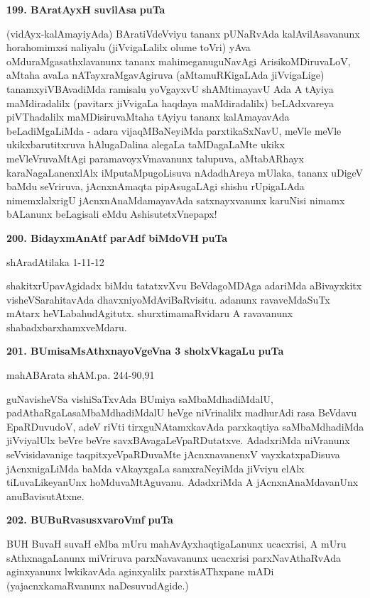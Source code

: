 \medskip
\noindent
\textbf{199. BAratAyxH suvilAsa} \hfill{\bf puTa \pageref{75}}

\smallskip
(vidAyx-kalAmayiyAda) BAratiVdeVviyu tananx pUNaRvAda kalAvilAsa\-vanunx horahomimxsi naliyalu (jiVvigaLalilx olume toVri) yAva oMdu\break raMgasathxlavanunx tananx mahimeganuguNavAgi Arisi\-koMDiruvaLoV, aMtaha avaLa nATayxraMgavAgiruva (aMtamuRKigaLAda jiVvigaLige) tanamxyiVBAva\-diMda rami\-salu yoVgayxvU shAMtimayavU Ada A tAyiya maMdiradalilx (pavitarx jiVvigaLa haqdaya maMdira\-dalilx) beLAdxvareya piVThadalilx maMDisiruvaMtaha tAyiyu tananx kalAmayavAda beLadiMga\-LiMda - adara vijaqMBaNeyiMda parxtikaSxNavU, meVle meVle ukikxbarutitxruva hAlugaDalina alegaLa taMDagaLaMte ukikx meVleVruvaMtAgi paramavoyxVmavanunx talupuva, aMtabARhayx karaNagaLanenxlAlx iMpu\-taMpu\-goLisuva nAdadhAreya mUlaka, tananx uDigeV baMdu seVriruva, jAcnxnAmaqta pipAsugaLAgi shishu rUpigaLAda nimemxlalxrigU jAcnxnAnaMdamayavAda satxnayxvanunx karuNisi nimamx bALanunx beLagisali eMdu AshisutetxVnepapx!

\medskip
\noindent
\textbf{200. BidayxmAnAtf parAdf biMdoVH} \hfill{\bf puTa \pageref{151}}

\hfill{shAradAtilaka 1-11-12}

\smallskip
shakitxrUpavAgidadx biMdu tatatxvXvu BeVdagoMDAga adariMda aBivayxkitx visheVSa\-rahitavAda dhavxniyoMdA\-viBaRvisitu. adanunx ravaveMdaSuTx mAtarx heVLabahu\-dAgitutx. shurxtimamaRvidaru A ravavanunx shabadxbarxhamx\-veMdaru.

\medskip
\noindent
\textbf{201. BUmisaMsAthxnayoVgeVna 3 sholxVkagaLu} \hfill{\bf puTa \pageref{26}}

\hfill{mahABArata shAM.pa. 244-90,91}

\smallskip
guNavisheVSa vishiSaTxvAda BUmiya saMbaMdhadiMdalU, padAthaRgaLa\break saMbaMdha\-diMdalU heVge niVrinalilx madhurAdi rasa BeVdavu EpaRDuvudoV, adeV riVti tirxguNAtamxkavAda parxkaqtiya saMbaMdhadiMda jiVviyalUlx beVre beVre savxBAva\-gaLeVpaRDutatxve. AdadxriMda niVranunx seVvisidavanige taqpitxyeVpaRDuvaMte jAcnxna\-vanenxV vayxkatxpaDisuva jAcnxnigaLiMda baMda vAkayxgaLa samxraNeyiMda jiVviyu elAlx tiLuvaLikeyanUnx hoMduvaMtAguvanu. AdadxriMda A jAcnxnAnaMdavanUnx anu\-BavisutAtxne.

\medskip
\noindent
\textbf{202. BUBuRvasusxvaroVmf} \hfill{\bf puTa \pageref{116}}

\smallskip
BUH BuvaH suvaH eMba mUru mahAvAyxhaqtigaLanunx ucacxrisi, A mUru sAthxnagaLanunx miVri\-ruva parxNavavanunx ucacxrisi parxNavAthaRvAda aginxyanunx lwkikavAda aginxyalilx parxtisAThxpane mADi (yajacnx\-kamaR\-vanunx naDesuvudAgide.)

